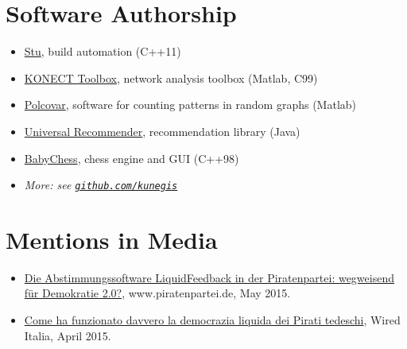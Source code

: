 \documentclass[line,mm]{res}
\newcounter{x}
\newcounter{y}
\begin{document}
\begin{resume}
\section{Software Authorship}
\begin{itemize}
  \item
    \href{https://github.com/kunegis/stu}{Stu}, build automation (C++11)
  \item 
    \href{https://github.com/kunegis/konect-toolbox}{KONECT Toolbox}, network analysis toolbox (Matlab, C99)
  \item 
    \href{https://github.com/kunegis/polcovar}{Polcovar}, software for counting patterns in random graphs (Matlab)
  \item
    \href{https://github.com/kunegis/universal-recommender}{Universal Recommender}, recommendation library (Java)
  \item
    \href{https://github.com/kunegis/babychess}{BabyChess}, chess engine and GUI (C++98)
  \item \emph{More:  see {\tt \href{https://github.com/kunegis}{github.com/kunegis}}}
\end{itemize}

\section{Mentions in Media}
\begin{itemize}
  \item
    \href{https://www.piratenpartei.de/2015/05/31/die-abstimmungssoftware-liquidfeedback-der-piratenpartei-wegweisend-fuer-demokratie-2-0/}{Die
      Abstimmungssoftware LiquidFeedback in der Piratenpartei:
      wegweisend für Demokratie 2.0?}, www.piratenpartei.de, May 2015. 
\item
  \href{http://www.wired.it/attualita/2015/04/01/come-funzionato-davvero-democrazia-liquida-dei-pirati-tedeschi/}{Come
    ha funzionato davvero la democrazia liquida dei Pirati tedeschi},
  Wired Italia, April 2015. 
\end{itemize}


\end{resume}
\end{document}
